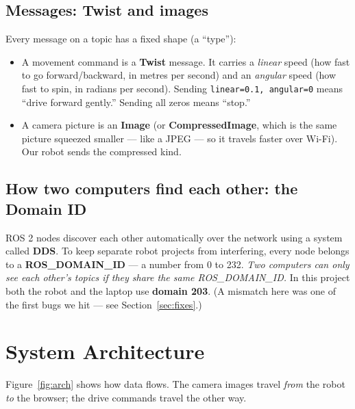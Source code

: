 \documentclass[11pt,a4paper]{article}
\newcommand{\code}[1]{\texttt{#1}}
\begin{document}
\subsection{Messages: Twist and images}
Every message on a topic has a fixed shape (a ``type''):
\begin{itemize}[noitemsep]
  \item A movement command is a \textbf{Twist} message. It carries a
        \emph{linear} speed (how fast to go forward/backward, in metres per
        second) and an \emph{angular} speed (how fast to spin, in radians per
        second). Sending \code{linear=0.1, angular=0} means ``drive forward
        gently.'' Sending all zeros means ``stop.''
  \item A camera picture is an \textbf{Image} (or \textbf{CompressedImage}, which
        is the same picture squeezed smaller --- like a JPEG --- so it travels
        faster over Wi-Fi). Our robot sends the compressed kind.
\end{itemize}

\subsection{How two computers find each other: the Domain ID}
\label{sec:domain}
ROS 2 nodes discover each other automatically over the network using a system
called \textbf{DDS}. To keep separate robot projects from interfering, every
node belongs to a \textbf{ROS\_DOMAIN\_ID} --- a number from 0 to 232. \emph{Two
computers can only see each other's topics if they share the same
ROS\_DOMAIN\_ID.} In this project both the robot and the laptop use
\textbf{domain 203}. (A mismatch here was one of the first bugs we hit ---
see Section~\ref{sec:fixes}.)

\section{System Architecture}
\label{sec:arch}
Figure~\ref{fig:arch} shows how data flows. The camera images travel
\emph{from} the robot \emph{to} the browser; the drive commands travel the
other way.
\end{document}
